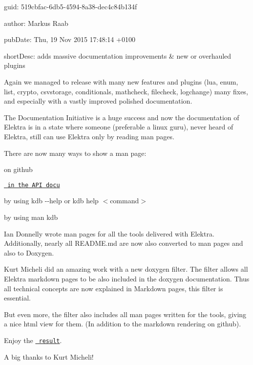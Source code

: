 
\begin{DoxyItemize}
\item guid\+: 519cbfac-\/6db5-\/4594-\/8a38-\/dec4c84b134f
\item author\+: Markus Raab
\item pub\+Date\+: Thu, 19 Nov 2015 17\+:48\+:14 +0100
\item short\+Desc\+: adds massive documentation improvements \& new or overhauled plugins
\end{DoxyItemize}

Again we managed to release with many new features and plugins (lua, enum, list, crypto, csvstorage, conditionals, mathcheck, filecheck, logchange) many fixes, and especially with a vastly improved polished documentation.

The Documentation Initiative is a huge success and now the documentation of Elektra is in a state where someone (preferable a linux guru), never heard of Elektra, still can use Elektra only by reading man pages.

There are now many ways to show a man page\+:


\begin{DoxyItemize}
\item on github
\item \href{https://doc.libelektra.org/api/latest/html/doc_help_kdb_md.html}{\texttt{ in the A\+PI docu}}
\item by using {\ttfamily kdb -\/-\/help} or {\ttfamily kdb help $<$command$>$}
\item by using {\ttfamily man kdb}
\end{DoxyItemize}

Ian Donnelly wrote man pages for all the tools delivered with Elektra. Additionally, nearly all R\+E\+A\+D\+M\+E.\+md are now also converted to man pages and also to Doxygen.

Kurt Micheli did an amazing work with a new doxygen filter. The filter allows all Elektra markdown pages to be also included in the doxygen documentation. Thus all technical concepts are now explained in Markdown pages, this filter is essential.

But even more, the filter also includes all man pages written for the tools, giving a nice html view for them. (In addition to the markdown rendering on github).

Enjoy the \href{https://doc.libelektra.org/api/0.8.14/html/}{\texttt{ result}}.

A big thanks to Kurt Micheli!


